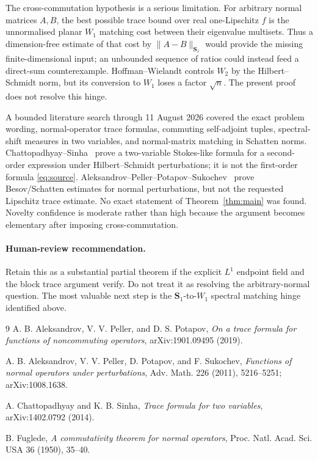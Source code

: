 \documentclass[11pt]{article}
\newcommand{\Sone}{\boldsymbol S_1}
\begin{document}
The cross-commutation hypothesis is a serious limitation.  For arbitrary
normal matrices \(A,B\), the best possible trace bound over real
one-Lipschitz \(f\) is the unnormalised planar \(W_1\) matching cost between
their eigenvalue multisets.  Thus a dimension-free estimate of that cost by
\(\|A-B\|_{\Sone}\) would provide the missing finite-dimensional input; an
unbounded sequence of ratios could instead feed a direct-sum counterexample.
Hoffman--Wielandt controls \(W_2\) by the Hilbert--Schmidt norm, but its
conversion to \(W_1\) loses a factor \(\sqrt n\).  The present proof does not
resolve this hinge.

A bounded literature search through 11 August 2026 covered the exact problem
wording, normal-operator trace formulas, commuting self-adjoint tuples,
spectral-shift measures in two variables, and normal-matrix matching in
Schatten norms.  Chattopadhyay--Sinha~\cite{CS} prove a two-variable
Stokes-like formula for a second-order expression under Hilbert--Schmidt
perturbations; it is not the first-order formula \eqref{eq:source}.
Aleksandrov--Peller--Potapov--Sukochev~\cite{APPS} prove Besov/Schatten
estimates for normal perturbations, but not the requested Lipschitz trace
estimate.  No exact statement of Theorem~\ref{thm:main} was found.  Novelty
confidence is moderate rather than high because the argument becomes
elementary after imposing cross-commutation.

\paragraph{Human-review recommendation.}
Retain this as a substantial partial theorem if the explicit \(L^1\) endpoint
field and the block trace argument verify.  Do not treat it as resolving the
arbitrary-normal question.  The most valuable next step is the
\(\Sone\)-to-\(W_1\) spectral matching hinge identified above.

\begin{thebibliography}{9}
A. B. Aleksandrov, V. V. Peller, and D. S. Potapov,
\emph{On a trace formula for functions of noncommuting operators},
arXiv:1901.09495 (2019).

A. B. Aleksandrov, V. V. Peller, D. Potapov, and F. Sukochev,
\emph{Functions of normal operators under perturbations},
Adv. Math. 226 (2011), 5216--5251; arXiv:1008.1638.

A. Chattopadhyay and K. B. Sinha,
\emph{Trace formula for two variables}, arXiv:1402.0792 (2014).

B. Fuglede,
\emph{A commutativity theorem for normal operators},
Proc. Natl. Acad. Sci. USA 36 (1950), 35--40.
\end{thebibliography}
\end{document}

